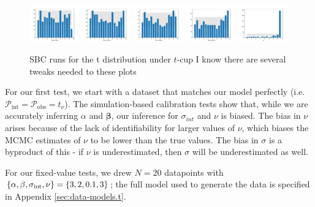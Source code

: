 \documentclass[fleqn,usenatbib]{mnras}
\begin{document}
\begin{figure}
    \includegraphics[width=0.19\textwidth]{graphics/sbc_t/alpha_scaled.pdf}
    \includegraphics[width=0.19\textwidth]{graphics/sbc_t/beta_scaled.0.pdf}
    \includegraphics[width=0.19\textwidth]{graphics/sbc_t/beta_scaled.1.pdf}
    \includegraphics[width=0.19\textwidth]{graphics/sbc_t/sigma_scaled.pdf}
    \includegraphics[width=0.19\textwidth]{graphics/sbc_t/nu.pdf}
    \caption{SBC runs for the t distribution under $t$-cup {\color{red} I know
    there are several tweaks needed to these plots}}
    \label{fig:results.t.sbc}
\end{figure}

For our first test, we start with a dataset that matches our model perfectly
(i.e.\ $\mathcal P_{\text{int}} = \mathcal P_{\text{obs}} = t_\nu$). The
simulation-based calibration tests show that, while we are accurately inferring
$\alpha$ and $\boldsymbol{\beta}$, our inference for $\sigma_{int}$ and $\nu$ is
biased. The bias in $\nu$ arises because of the lack of identifiability for
larger values of $\nu$, which biases the MCMC estimates of $\nu$ to be lower
than the true values. The bias in $\sigma$ is a byproduct of this - if $\nu$ is
underestimated, then $\sigma$ will be underestimated as well.

For our fixed-value tests, we drew $N = 20$ datapoints with $\{\alpha, \beta,
\sigma_{\rm int}, \nu\} = \{3, 2, 0.1, 3\}$; the full model used to generate the
data is specified in Appendix \ref{sec:data-models.t}.
\end{document}
